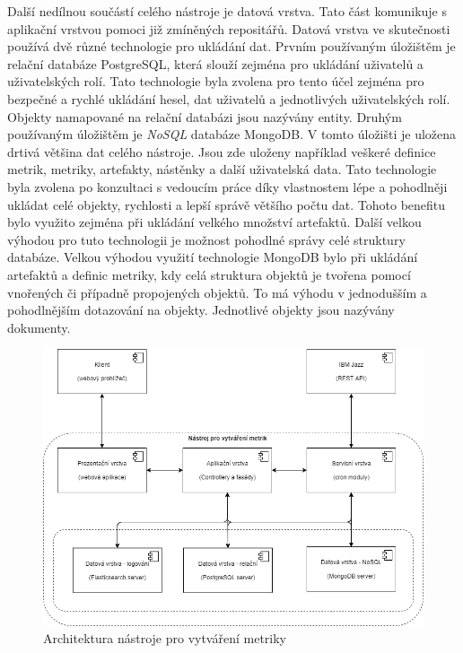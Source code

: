 \documentclass[czech,master]{diploma}
\begin{document}
Další nedílnou součástí celého nástroje je datová vrstva. Tato část komunikuje s aplikační vrstvou pomoci již zmíněných repositářů. Datová vrstva ve skutečnosti používá dvě různé technologie pro ukládání dat. Prvním používaným úložištěm je relační databáze PostgreSQL, která slouží zejména pro ukládání uživatelů a uživatelských rolí. Tato technologie byla zvolena pro tento účel zejména pro bezpečné a rychlé ukládání hesel, dat uživatelů a jednotlivých uživatelských rolí. Objekty namapované na relační databázi jsou nazývány entity. Druhým používaným úložištěm je \textit{NoSQL} databáze MongoDB. V tomto úložišti je uložena drtivá většina dat celého nástroje. Jsou zde uloženy například veškeré definice metrik, metriky, artefakty, nástěnky a další uživatelská data. Tato technologie byla zvolena po konzultaci s vedoucím práce díky vlastnostem lépe a pohodlněji ukládat celé objekty, rychlosti a lepší správě většího počtu dat. Tohoto benefitu bylo využito zejména při ukládání velkého množství artefaktů. Další velkou výhodou pro tuto technologii je možnost pohodlné správy celé struktury databáze. Velkou výhodou využití technologie MongoDB bylo při ukládání artefaktů a definic metriky, kdy celá struktura objektů je tvořena pomocí vnořených či případně propojených objektů. To má výhodu v jednodušším a pohodlnějším dotazování na objekty. Jednotlivé objekty jsou nazývány dokumenty.



\begin{figure}[!ht]
    \centering
    \includegraphics[width=1\textwidth]{Diplomka/Figures/architektura.png}
    \caption{Architektura nástroje pro vytváření metriky}
    \label{fig:architektura_nastroje}
\end{figure}
\end{document}
